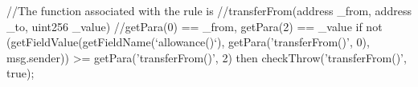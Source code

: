 //The function associated with the rule is 
//transferFrom(address _from, address _to, uint256 _value) 
//getPara(0) == _from, getPara(2) == _value
if not (getFieldValue(getFieldName(`allowance()`), getPara('transferFrom()', 0), msg.sender)) >= getPara('transferFrom()', 2)
then 
  checkThrow('transferFrom()', true);